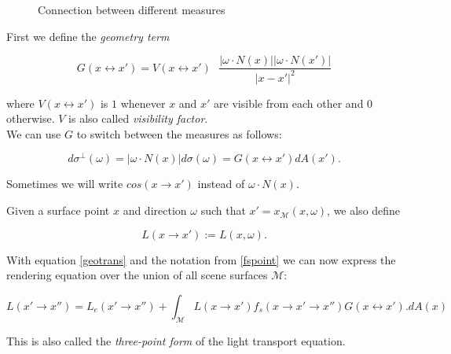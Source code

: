 \begin{figure}[ht]
	\centering
\def\svgwidth{240pt}
  
\caption{Connection between different measures}
\label{geometryconversions}\end{figure}

First we define the \emph{geometry term}

\begin{equation*}
G(x \leftrightarrow x') = V(x \leftrightarrow x') \text{ } \frac{|\omega \cdot N(x)| |\omega \cdot N(x')|}{|x-x'|^2}
\end{equation*}

where $V(x \leftrightarrow x')$ is $1$ whenever $x$ and $x'$ are visible from each other and $0$ otherwise. $V$ is also called \emph{visibility factor}.\\
We can use $G$ to switch between the measures as follows:

\begin{equation}
\label{geotrans}
d\sigma^\bot(\omega) = |\omega \cdot N(x)| d\sigma(\omega) = G(x \leftrightarrow x')dA(x').
\end{equation}

Sometimes we will write $cos(x \rightarrow x')$ instead of $\omega \cdot N(x)$.

Given a surface point $x$ and direction $\omega$ such that $x' = x_\mathcal{M}(x,\omega)$, we also define

\begin{equation*}
L(x \rightarrow x') := L(x,\omega).
\end{equation*}

With equation \ref{geotrans} and the notation from \ref{fspoint} we can now express the rendering equation over the union of all scene surfaces $\mathcal{M}$:

\begin{equation}
\label{tpf}
L(x'\rightarrow x'') = L_e(x' \rightarrow x'') + \int_\mathcal{M}L(x \rightarrow x') f_s(x \rightarrow x' \rightarrow x'') G(x \leftrightarrow x'). dA(x)
\end{equation}

This is also called the \emph{three-point form} of the light transport equation.
